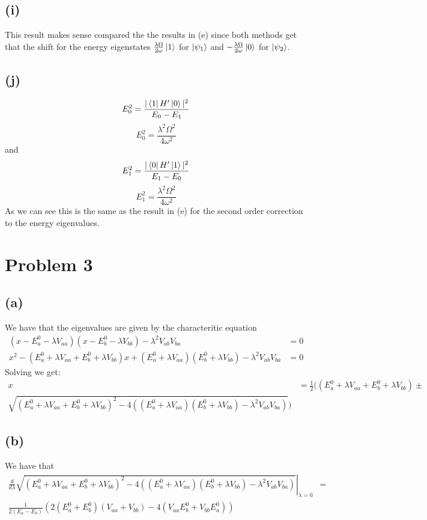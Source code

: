 \documentclass[11pt]{article}
\begin{document}
\subsection*{(i)}
This result makes sense compared the the results in (e) since both methods get
that the shift for the energy eigenstates $\frac{\lambda\Omega}{2\omega}\ket{1}$ for 
$\ket{\psi_1}$ and $-\frac{\lambda\Omega}{2\omega}\ket{0}$ for $\ket{\psi_2}$.
\subsection*{(j)}
$$E_{0}^{2}=\frac{|\bra{1}H'\ket{0}|^2}{E_{0}-E_{1}}$$
$$E_{0}^{2}=\frac{\lambda^2\Omega^2}{4\omega^2}$$
and
$$E_{1}^{2}=\frac{|\bra{0}H'\ket{1}|^2}{E_{1}-E_{0}}$$
$$E_{1}^{2}=\frac{\lambda^2\Omega^2}{4\omega^2}$$
As we can see this is the same as the result in (e) for the second order correction to 
the energy eigenvalues.
\section*{Problem 3}
\subsection*{(a)}
We have that the eigenvalues are given by the characteritic equation
\begin{align*}
    (x-E_a^0-\lambda V_{aa})(x-E_b^0-\lambda V_{bb})-\lambda^2V_{ab}V_{ba}&=0\\
    x^2-(E_a^0+\lambda V_{aa}+E_b^0+\lambda V_{bb})x+(E_a^0+\lambda V_{aa})
(E_b^0+\lambda V_{bb})-\lambda^2V_{ab}V_{ba}&=0
\end{align*}
Solving we get:
\begin{align*}
    x&=\frac{1}{2}((E_a^0+\lambda V_{aa}+E_b^0+\lambda V_{bb})\pm\\
    \sqrt{(E_a^0+\lambda V_{aa}+E_b^0+\lambda V_{bb})^2-4((E_a^0+\lambda V_{aa})
    (E_b^0+\lambda V_{bb})-\lambda^2V_{ab}V_{ba})})
\end{align*}
\subsection*{(b)}
We have that 
\begin{align*}
    \left.\frac{d}{d\lambda}\sqrt{(E_a^0+\lambda V_{aa}+E_b^0+\lambda V_{bb})^2-4((E_a^0+\lambda V_{aa})
    (E_b^0+\lambda V_{bb})-\lambda^2V_{ab}V_{ba})}\right|_{\lambda=0} &= \\
    \frac{1}{2(E_a-E_b)}(2(E_a^0+E_b^0)(V_{aa}+V_{bb})-4(V_{aa}E_{b}^0+V_{bb}E_{a}^0))
\end{align*}
\end{document}
